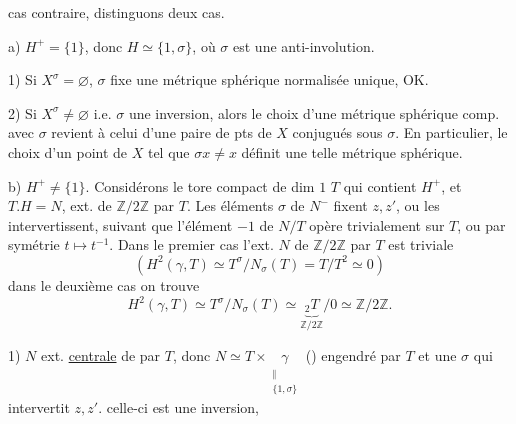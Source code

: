cas contraire, distinguons deux cas.

a) $H^+=\{1\}$, donc $H\simeq\{1,\sigma\}$, où $\sigma$ est une anti-involution.

1) Si \deleted{\unsure{$\sigma$}} $X^\sigma=\varnothing$, $\sigma$ fixe une métrique sphérique normalisée unique, OK.

2) Si $X^\sigma\ne\varnothing$ i.e. $\sigma$ une inversion, alors le choix d'une métrique sphérique comp. avec $\sigma$ revient à celui d'une paire de pts de $X$ conjugués sous $\sigma$. En particulier, le choix d'un point de $X$ tel que $\sigma x\ne x$ définit une telle métrique sphérique.

b) $H^+\ne\{1\}$. Considérons le tore  compact de dim $1$ $T$ qui contient $H^+$, et $T.H=N$, ext. de  $\mathbb Z/2\mathbb Z$ par $T$. Les éléments  $\sigma$ de $N^-$ fixent $z,z'$, ou les intervertissent, suivant que l'élément $-1$ de $N/T$ opère trivialement sur $T$, ou par symétrie $t\longmapsto t^{-1}$.
Dans le premier cas l'ext. $N$ de\inserted{$\gamma=$} $\mathbb Z/2\mathbb Z$ par $T$ est triviale
\[
\left(H^2(\gamma,T)\simeq T^\sigma/N_\sigma(T)=T/T^2\simeq0\right)
\]
dans le deuxième cas on trouve
\[
H^2(\gamma,T)\simeq T^\sigma/N_\sigma(T)\simeq\underbrace{{}_2T}_{\mathbb Z/2\mathbb Z}/0\simeq\mathbb Z/2\mathbb Z.
\]

1) $N$ ext. \uline{centrale} de \inserted{$\gamma$} par $T$, donc $N\simeq T\times\underset{\substack{\Vert\\\{1,\sigma\}}}{\gamma}$ () engendré par $T$ et une $\sigma$  qui  intervertit $z,z'$.   celle-ci est une inversion, 

